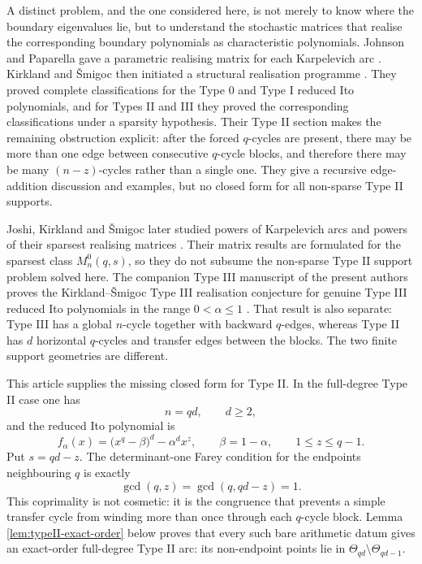 \documentclass[11pt]{article}
\theoremstyle{definition}
\theoremstyle{remark}
\begin{document}
A distinct problem, and the one considered here, is not merely to know where the boundary eigenvalues lie, but to understand the stochastic matrices that realise the corresponding boundary polynomials as characteristic polynomials.  Johnson and Paparella gave a parametric realising matrix for each Karpelevich arc \cite{JohnsonPaparella2017}.  Kirkland and \v Smigoc then initiated a structural realisation programme \cite{KirklandSmigoc2022}.  They proved complete classifications for the Type 0 and Type I reduced Ito polynomials, and for Types II and III they proved the corresponding classifications under a sparsity hypothesis.  Their Type II section makes the remaining obstruction explicit: after the forced $q$-cycles are present, there may be more than one edge between consecutive $q$-cycle blocks, and therefore there may be many $(n-z)$-cycles rather than a single one.  They give a recursive edge-addition discussion and examples, but no closed form for all non-sparse Type II supports.

Joshi, Kirkland and \v Smigoc later studied powers of Karpelevich arcs and powers of their sparsest realising matrices \cite{JoshiKirklandSmigoc2023}.  Their matrix results are formulated for the sparsest class $M_n^0(q,s)$, so they do not subsume the non-sparse Type II support problem solved here.  The companion Type III manuscript of the present authors proves the Kirkland--\v Smigoc Type III realisation conjecture for genuine Type III reduced Ito polynomials in the range $0<\alpha\le 1$ \cite{VerbekenGinisTypeIII}.  That result is also separate: Type III has a global $n$-cycle together with backward $q$-edges, whereas Type II has $d$ horizontal $q$-cycles and transfer edges between the blocks.  The two finite support geometries are different.

This article supplies the missing closed form for Type II.  In the full-degree Type II case one has
\[
        n=qd,\qquad d\ge 2,
\]
and the reduced Ito polynomial is
\begin{equation}
        f_\alpha(x)=\bigl(x^q-\beta\bigr)^d-\alpha^d x^z,
        \qquad \beta=1-\alpha,
        \qquad 1\le z\le q-1 .
        \label{eq:typeIIpoly}
\end{equation}
Put $s=qd-z$.  The determinant-one Farey condition for the endpoints neighbouring $q$ is exactly
\[
        \gcd(q,z)=\gcd(q,qd-z)=1 .
\]
This coprimality is not cosmetic: it is the congruence that prevents a simple transfer cycle from winding more than once through each $q$-cycle block.  Lemma \ref{lem:typeII-exact-order} below proves that every such bare arithmetic datum gives an exact-order full-degree Type II arc: its non-endpoint points lie in $\Theta_{qd}\setminus\Theta_{qd-1}$.
\end{document}
